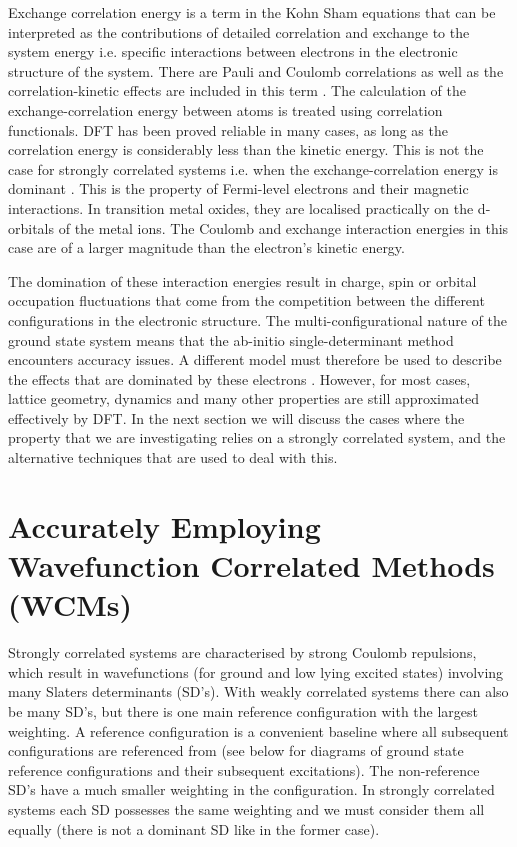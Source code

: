 \documentclass[10pt]{article}
\begin{document}
Exchange correlation energy is a term in the Kohn Sham equations that can be interpreted as the contributions of detailed correlation and exchange to the system energy i.e. specific interactions between electrons in the electronic structure of the system. There are Pauli and Coulomb correlations as well as the correlation-kinetic effects are included in this term \cite{kohn1965self,refson2006variational}. The calculation of the exchange-correlation energy between atoms is treated using correlation functionals. DFT has been proved reliable in many cases, as long as the correlation energy is considerably less than the kinetic energy. This is not the case for strongly correlated systems i.e. when the exchange-correlation energy is dominant \cite{pickett1989electronic}. This is the property of Fermi-level electrons and their magnetic interactions. In transition metal oxides, they are localised practically on the d-orbitals of the metal ions. The Coulomb and exchange interaction energies in this case are of a larger magnitude than the electron's kinetic energy.

The domination of these interaction energies result in charge, spin or orbital occupation fluctuations that come from the competition between the different configurations in the electronic structure. The multi-configurational nature of the ground state system means that the ab-initio single-determinant method encounters accuracy issues. A different model must therefore be used to describe the effects that are dominated by these electrons \cite{gelle2009accurate}. However, for most cases, lattice geometry, dynamics and many other properties are still approximated effectively by DFT. In the next section we will discuss the cases where the property that we are investigating relies on a strongly correlated system, and the alternative techniques that are used to deal with this. 

\section{Accurately Employing Wavefunction Correlated Methods (WCMs)}

Strongly correlated systems are characterised by strong Coulomb repulsions, which result in wavefunctions (for ground and low lying excited states) involving many Slaters determinants (SD's). With weakly correlated systems there can also be many SD's, but there is one main reference configuration with the largest weighting. A reference configuration is a convenient baseline where all subsequent configurations are referenced from (see below for diagrams of ground state reference configurations and their subsequent excitations). The non-reference SD's have a much smaller weighting in the configuration. In strongly correlated systems each SD possesses the same weighting and we must consider them all equally (there is not a dominant SD like in the former case).
\end{document}
